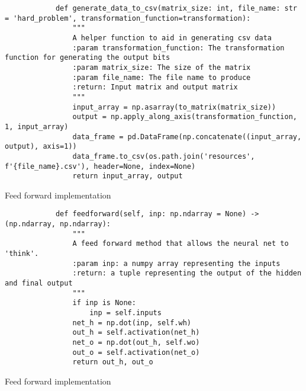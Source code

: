 \documentclass[11pt, a4paper]{article}
\begin{document}
    \begin{listing}[H]
        \begin{verbatim}
            def generate_data_to_csv(matrix_size: int, file_name: str = 'hard_problem', transformation_function=transformation):
                """
                A helper function to aid in generating csv data
                :param transformation_function: The transformation function for generating the output bits
                :param matrix_size: The size of the matrix
                :param file_name: The file name to produce
                :return: Input matrix and output matrix
                """
                input_array = np.asarray(to_matrix(matrix_size))
                output = np.apply_along_axis(transformation_function, 1, input_array)
                data_frame = pd.DataFrame(np.concatenate((input_array, output), axis=1))
                data_frame.to_csv(os.path.join('resources', f'{file_name}.csv'), header=None, index=None)
                return input_array, output
        \end{verbatim}
        \caption{Feed forward implementation}
    \end{listing}

    \begin{listing}[H]
        \begin{verbatim}
            def feedforward(self, inp: np.ndarray = None) -> (np.ndarray, np.ndarray):
                """
                A feed forward method that allows the neural net to 'think'.
                :param inp: a numpy array representing the inputs
                :return: a tuple representing the output of the hidden and final output
                """
                if inp is None:
                    inp = self.inputs
                net_h = np.dot(inp, self.wh)
                out_h = self.activation(net_h)
                net_o = np.dot(out_h, self.wo)
                out_o = self.activation(net_o)
                return out_h, out_o
        \end{verbatim}
        \caption{Feed forward implementation}
    \end{listing}
\end{document}
